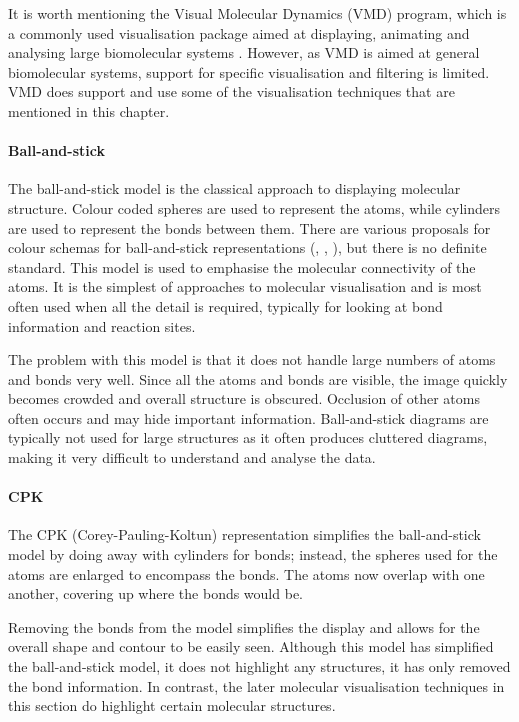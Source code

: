 It is worth mentioning the Visual Molecular Dynamics (VMD) \citep{humphrey96}
program, which is a commonly used visualisation package aimed at displaying,
animating and analysing large biomolecular systems \citep{VMD}. However, as VMD
is aimed at general biomolecular systems, support for specific visualisation
and filtering is limited. VMD does support and use some of the visualisation
techniques that are mentioned in this chapter.


\paragraph{Ball-and-stick}

The ball-and-stick model is the classical approach to displaying molecular
structure. Colour coded spheres are used to represent the atoms, while
cylinders are used to represent the bonds between them. There are various
proposals for colour schemas for ball-and-stick representations
(\citep{rasmolcolour}, \citep{jmolcolour}, \citep{drumscolour}), but there is
no definite standard. This model is used to emphasise the molecular
connectivity of the atoms. It is the simplest of approaches to molecular
visualisation and is most often used when all the detail is required, typically
for looking at bond information and reaction sites.

The problem with this model is that it does not handle large numbers of atoms
and bonds very well. Since all the atoms and bonds are visible, the image
quickly becomes crowded and overall structure is obscured. Occlusion of other
atoms often occurs and may hide important information. Ball-and-stick diagrams
are typically not used for large structures as it often produces cluttered
diagrams, making it very difficult to understand and analyse the data.


\paragraph{CPK}

The CPK (Corey-Pauling-Koltun) \citep{corey53} representation simplifies the
ball-and-stick model by doing away with cylinders for bonds; instead, the
spheres used for the atoms are enlarged to encompass the bonds. The atoms now
overlap with one another, covering up where the bonds would be.

Removing the bonds from the model simplifies the display and allows for the
overall shape and contour to be easily seen. Although this model has simplified
the ball-and-stick model, it does not highlight any structures, it has only
removed the bond information. In contrast, the later molecular visualisation
techniques in this section do highlight certain molecular structures.

